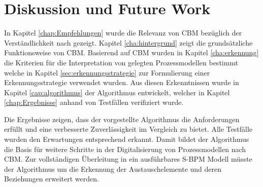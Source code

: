 %
%
% 
% 
% 


\chapter{Diskussion und Future Work}
\label{chap:Diskussion}
In Kapitel \ref{chap:Empfehlungen} wurde die Relevanz von CBM bezüglich der Verständlichkeit nach \citet{MENDLING2010127} gezeigt. Kapitel \ref{cha:hintergrund} zeigt die grundsätzliche Funktionsweise von CBM. Basierend auf CBM wurden in Kapitel \ref{cha:erkennung} die Kriterien für die Interpretation von gelegten Prozessmodellen bestimmt welche in Kapitel \ref{sec:erkennungsstrategie} zur Formulierung einer Erkennungsstrategie verwendet wurden. Aus diesen Erkenntnissen wurde in Kapitel \ref{cap:algorithmus} der Algorithmus entwickelt, welcher in Kapitel \ref{chap:Ergebnisse} anhand von Testfällen verifiziert wurde. 

Die Ergebnisse zeigen, dass der vorgestellte Algorithmus die Anforderungen erfüllt und eine verbesserte Zuverlässigkeit im Vergleich zu \citet{max} bietet. Alle Testfälle wurden den Erwartungen entsprechend erkannt. Damit bildet der Algorithmus die Basis für weitere Schritte in der Digitalisierung von Prozessmodellen nach CBM. Zur vollständigen Überleitung in ein ausführbares S-BPM Modell müsste der Algorithmus um die Erkennung der Austauschelemente und deren Beziehungen erweitert werden. 